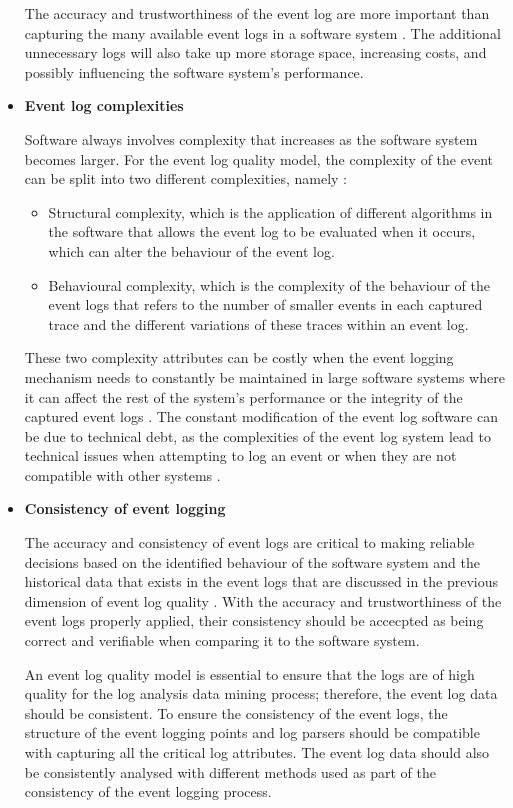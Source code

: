 \begin{itemize}
	The accuracy and trustworthiness of the event log are more important than capturing the many available event logs in a software system \cite{Zhu2015, Jans2012}. The additional unnecessary logs will also take up more storage space, increasing costs, and possibly influencing the software system's performance. 

	\item \textbf{Event log complexities}\par Software always involves complexity that increases as the software system becomes larger. For the event log quality model, the complexity of the event can be split into two different complexities, namely \cite{Kherbouche2017}:

	\begin{itemize}
		\item Structural complexity, which is the application of different algorithms in the software that allows the event log to be evaluated when it occurs, which can alter the behaviour of the event log.
		\item Behavioural complexity, which is the complexity of the behaviour of the event logs that refers to the number of smaller events in each captured trace and the different variations of these traces within an event log.
	\end{itemize}

	These two complexity attributes can be costly when the event logging mechanism needs to constantly be maintained in large software systems where it can affect the rest of the system's performance or the integrity of the captured event logs \cite{Ogheneovo2014}. The constant modification of the event log software can be due to technical debt, as the complexities of the event log system lead to technical issues when attempting to log an event or when they are not compatible with other systems \cite{DeLeon-Sigg2020}.  

 	\item \textbf{Consistency of event logging}\par The accuracy and consistency of event logs are critical to making reliable decisions based on the identified behaviour of the software system and the historical data that exists in the event logs that are discussed in the previous dimension of event log quality \cite{Stojanov2017, Kherbouche2017}. With the accuracy and trustworthiness of the event logs properly applied, their consistency should be accecpted as being correct and verifiable when comparing it to the software system. \par An event log quality model is essential to ensure that the logs are of high quality for the log analysis data mining process; therefore, the event log data should be consistent. To ensure the consistency of the event logs, the structure of the event logging points and log parsers should be compatible with capturing all the critical log attributes. The event log data should also be consistently analysed with different methods used as part of the consistency of the event logging process.


\end{itemize}
